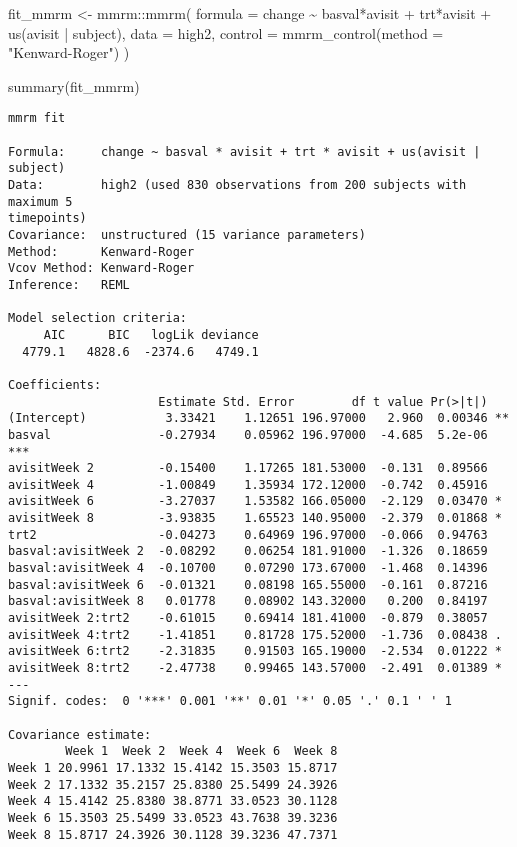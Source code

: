 \documentclass[
  letterpaper,
  DIV=11,
  numbers=noendperiod]{scrreprt}
\newenvironment{Shaded}{\begin{snugshade}}{\end{snugshade}}
\newcommand{\AttributeTok}[1]{\textcolor[rgb]{0.40,0.45,0.13}{#1}}
\newcommand{\FunctionTok}[1]{\textcolor[rgb]{0.28,0.35,0.67}{#1}}
\newcommand{\NormalTok}[1]{\textcolor[rgb]{0.00,0.23,0.31}{#1}}
\newcommand{\OtherTok}[1]{\textcolor[rgb]{0.00,0.23,0.31}{#1}}
\newcommand{\SpecialCharTok}[1]{\textcolor[rgb]{0.37,0.37,0.37}{#1}}
\newcommand{\StringTok}[1]{\textcolor[rgb]{0.13,0.47,0.30}{#1}}
\begin{document}
\begin{Shaded}
\begin{Highlighting}[]
\NormalTok{fit\_mmrm }\OtherTok{\textless{}{-}}\NormalTok{ mmrm}\SpecialCharTok{::}\FunctionTok{mmrm}\NormalTok{(}
  \AttributeTok{formula =}\NormalTok{ change }\SpecialCharTok{\textasciitilde{}}\NormalTok{ basval}\SpecialCharTok{*}\NormalTok{avisit }\SpecialCharTok{+}\NormalTok{ trt}\SpecialCharTok{*}\NormalTok{avisit }\SpecialCharTok{+} \FunctionTok{us}\NormalTok{(avisit }\SpecialCharTok{|}\NormalTok{ subject),}
  \AttributeTok{data =}\NormalTok{ high2,}
  \AttributeTok{control =} \FunctionTok{mmrm\_control}\NormalTok{(}\AttributeTok{method =} \StringTok{"Kenward{-}Roger"}\NormalTok{)}
\NormalTok{)}

\FunctionTok{summary}\NormalTok{(fit\_mmrm)}
\end{Highlighting}
\end{Shaded}

\begin{verbatim}
mmrm fit

Formula:     change ~ basval * avisit + trt * avisit + us(avisit | subject)
Data:        high2 (used 830 observations from 200 subjects with maximum 5 
timepoints)
Covariance:  unstructured (15 variance parameters)
Method:      Kenward-Roger
Vcov Method: Kenward-Roger
Inference:   REML

Model selection criteria:
     AIC      BIC   logLik deviance 
  4779.1   4828.6  -2374.6   4749.1 

Coefficients: 
                     Estimate Std. Error        df t value Pr(>|t|)    
(Intercept)           3.33421    1.12651 196.97000   2.960  0.00346 ** 
basval               -0.27934    0.05962 196.97000  -4.685  5.2e-06 ***
avisitWeek 2         -0.15400    1.17265 181.53000  -0.131  0.89566    
avisitWeek 4         -1.00849    1.35934 172.12000  -0.742  0.45916    
avisitWeek 6         -3.27037    1.53582 166.05000  -2.129  0.03470 *  
avisitWeek 8         -3.93835    1.65523 140.95000  -2.379  0.01868 *  
trt2                 -0.04273    0.64969 196.97000  -0.066  0.94763    
basval:avisitWeek 2  -0.08292    0.06254 181.91000  -1.326  0.18659    
basval:avisitWeek 4  -0.10700    0.07290 173.67000  -1.468  0.14396    
basval:avisitWeek 6  -0.01321    0.08198 165.55000  -0.161  0.87216    
basval:avisitWeek 8   0.01778    0.08902 143.32000   0.200  0.84197    
avisitWeek 2:trt2    -0.61015    0.69414 181.41000  -0.879  0.38057    
avisitWeek 4:trt2    -1.41851    0.81728 175.52000  -1.736  0.08438 .  
avisitWeek 6:trt2    -2.31835    0.91503 165.19000  -2.534  0.01222 *  
avisitWeek 8:trt2    -2.47738    0.99465 143.57000  -2.491  0.01389 *  
---
Signif. codes:  0 '***' 0.001 '**' 0.01 '*' 0.05 '.' 0.1 ' ' 1

Covariance estimate:
        Week 1  Week 2  Week 4  Week 6  Week 8
Week 1 20.9961 17.1332 15.4142 15.3503 15.8717
Week 2 17.1332 35.2157 25.8380 25.5499 24.3926
Week 4 15.4142 25.8380 38.8771 33.0523 30.1128
Week 6 15.3503 25.5499 33.0523 43.7638 39.3236
Week 8 15.8717 24.3926 30.1128 39.3236 47.7371
\end{verbatim}
\end{document}

